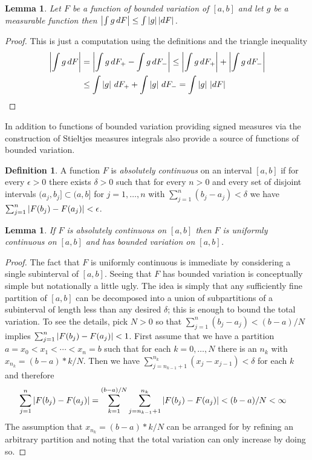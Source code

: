 \documentclass{amsart}
\newtheorem{lem}[thm]{Lemma}
\theoremstyle{remark}
\theoremstyle{definition}
\newtheorem{defn}[thm]{Definition}
\begin{document}
\begin{lem}\label{AbsoluteValueOfStieltjes}Let $F$ be a function of bounded variation of $[a,b]$ and
  let $g$ be a measurable function then $\left \vert  \int g \, dF \right \vert \leq \int
  \left \vert g \right \vert \left \vert dF \right \vert$.
\end{lem}
\begin{proof}
This is just a computation using the definitions and the triangle inequality
\begin{align*}
\left \vert \int g \, dF \right \vert &= \left \vert \int g \, dF_+ - \int g \, dF_- \right \vert \leq
\left \vert \int g \, dF_+ \right \vert  + \left \vert  \int g \, dF_- \right \vert \\
&\leq\int \left \vert  g \right \vert \,
dF_++ \int \left \vert  g \right \vert \, dF_- = \int \left \vert g \right \vert \, \left \vert dF \right \vert
\end{align*}
\end{proof}

In addition to functions of bounded variation providing signed
measures via the construction of Stieltjes measures integrals also
provide a source of functions of bounded variation.

\begin{defn}A function $F$ is \emph{absolutely continuous} on an
  interval $[a,b]$ if for every $\epsilon > 0$ there exists $\delta>0$
  such that for every $n > 0$ and every set of disjoint intervals $(a_j, b_j] \subset
  (a,b]$ for $j=1, \dotsc, n$ with $\sum_{j=1}^n (b_j-a_j) < \delta$
  we have $\sum_{j=1}^n \left \vert F(b_j)-F(a_j) \right \vert < \epsilon$.
\end{defn}

\begin{lem}\label{AbsoluteContinuityImpliesContinuousBoundedVariation}If $F$ is absolutely continuous on $[a,b]$ then $F$ is
 uniformly continuous on $[a,b]$ and has bounded variation on $[a,b]$.
\end{lem}
\begin{proof}
The fact that $F$ is uniformly continuous is immediate by considering a single
subinterval of $[a,b]$.  Seeing that $F$ has bounded variation is
conceptually simple but notationally a little ugly.  The idea is simply
that any sufficiently fine partition of $[a,b]$ can be decomposed into
a union of subpartitions of a subinterval of length less than any
desired $\delta$; this is enough to bound the total variation. To see
the details, pick
$N > 0$ so that  $\sum_{j=1}^n (b_j-a_j) < (b-a)/N$ implies
$\sum_{j=1}^n \left \vert F(b_j)-F(a_j) \right \vert < 1$.  First assume that we have a
partition $a=x_0 < x_1 < \dotsb < x_n=b$ such that for each $k=0,
\dotsc, N$ there is an $n_k$ with $x_{n_k} = (b-a)*k/N$. Then we
have $\sum_{j=n_{k-1}+1}^{n_k} (x_j - x_{j-1}) < \delta$ for
each $k$ and therefore
\begin{align*}
\sum_{j=1}^n \left \vert F(b_j)-F(a_j) \right \vert &= \sum_{k=1}^{(b-a)/N}\sum_{j=n_{k-1}+1}^{n_k}
\left \vert F(b_j)-F(a_j) \right \vert < (b-a) /N < \infty
\end{align*}
The assumption that $x_{n_k} = (b-a)*k/N$ can be arranged for by refining
an arbitrary partition and noting that the total variation can only increase by
doing so.
\end{proof}
\end{document}
